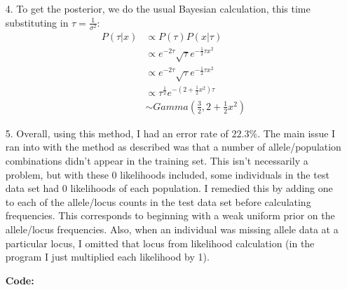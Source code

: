 \documentclass[11pt]{article}
\theoremstyle{definition}
\begin{document}
\begin{itemize}
    \item[4.]
        To get the posterior, we do the usual Bayesian calculation, this time substituting in \(\tau=\frac{1}{\sigma^2}\):
        \begin{align*}
            P(\tau|x) &\propto P(\tau) P(x|\tau) \\
                      &\propto e^{-2\tau} \sqrt{\tau}e^{-\frac{1}{2}\tau x^2} \\
                      &\propto e^{-2\tau} \sqrt{\tau}e^{-\frac{1}{2}\tau x^2} \\
                      &\propto \tau^\frac{1}{2}e^{-(2+\frac{1}{2}x^2)\tau} \\
                      &\sim Gamma\left(\frac{3}{2},2+\frac{1}{2}x^2\right) 
        \end{align*}

    \item[5.]
        Overall, using this method, I had an error rate of $22.3\%$. The main issue I ran into with the method as described was that a number of allele/population combinations didn't appear in the training set. This isn't necessarily a problem, but with these 0 likelihoods included, some individuals in the test data set had 0 likelihoods of each population. I remedied this by adding one to each of the allele/locus counts in the test data set before calculating frequencies. This corresponds to beginning with a weak uniform prior on the allele/locus frequencies. Also, when an individual was missing allele data at a particular locus, I omitted that locus from likelihood calculation (in the program I just multiplied each likelihood by 1).
        
        {\bf Code:}
        

\end{itemize}
\end{document}

